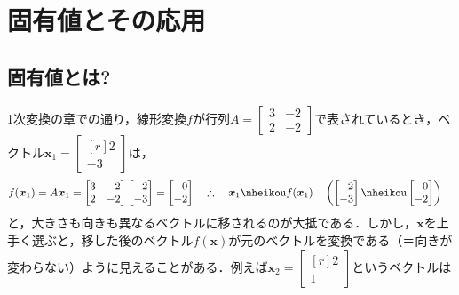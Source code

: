 \chapter{固有値とその応用}
\setcounter{page}{1}

\section{固有値とは?}

1次変換の章での通り，線形変換$f$が行列$A =
\begin{bmatrix}
	3 & -2\\ 2 & -2
\end{bmatrix}
$で表されているとき，ベクトル$\bm{x}_1 =
\begin{bmatrix*}[r]
	2\\ -3
\end{bmatrix*}
$は，
\begin{align*}
	&f(\bm{x}_1) = A\bm{x}_1 =
	\begin{bmatrix*}[r]
		3 & -2\\ 2 & -2
	\end{bmatrix*}
	\begin{bmatrix*}[r]
		2\\ -3
	\end{bmatrix*}
	=
	\begin{bmatrix*}[r]
		0\\ -2
	\end{bmatrix*}
	&
	&\therefore\quad \bm{x}_1 \nheikou f(\bm{x}_1) \quad \left(
		\begin{bmatrix*}[r]
			2\\ -3
		\end{bmatrix*}
		\nheikou
		\begin{bmatrix*}[r]
			0\\ -2
		\end{bmatrix*}
	\right)
\end{align*}
と，大きさも向きも異なるベクトルに移されるのが大抵である．しかし，$\bm{x}$を上手く選ぶと，移した後のベクトル$f(\bm{x})$が元のベクトルを変換である（＝向きが変わらない）ように見えることがある．例えば$\bm{x}_2 =
\begin{bmatrix*}[r]
	2\\ 1
\end{bmatrix*}$というベクトルは

